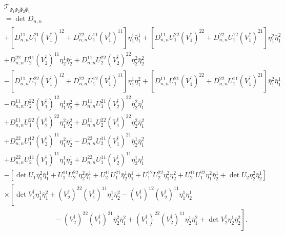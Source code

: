 \begin{align}
\label{eq:explicit}
	&\mathcal{T}_{\Psi_1\Psi_2\bar{\Psi}_2\bar{\Psi}_1}\nonumber\\
	&=\det D_{n,n} \nonumber \\
	&+\left[
	D^{11}_{n,n}U^{21}_{1}(V^{\dag}_{1})^{12}
	+D^{22}_{n,n}U^{11}_{1}(V^{\dag}_{1})^{11}
	\right]\eta^{1}_{1}\bar{\eta}^{1}_{1}
	+\left[
	D^{11}_{n,n}U^{22}_{1}(V^{\dag}_{1})^{22}
	+D^{22}_{n,n}U^{12}_{1}(V^{\dag}_{1})^{21}
	\right]\eta^{2}_{1}\bar{\eta}^{2}_{1}\nonumber\\
	&+D^{22}_{n,n}U^{11}_{2}(V^{\dag}_{2})^{11}\eta^{1}_{2}\bar{\eta}^{1}_{2}
	+D^{11}_{n,n}U^{22}_{2}(V^{\dag}_{2})^{22}\eta^{2}_{2}\bar{\eta}^{2}_{2}\nonumber\\
	&-\left[
	D^{11}_{n,n}U_{1}^{22}(V_{1}^{\dag})^{12}
	+D^{22}_{n,n}U_{1}^{12}(V_{1}^{\dag})^{11}
	\right]\eta^{1}_{1}\eta^{2}_{1}
	+\left[
	D^{11}_{n,n}U_{1}^{21}(V_{1}^{\dag})^{22}
	+D^{22}_{n,n}U_{1}^{11}(V_{1}^{\dag})^{21}
	\right]\bar{\eta}^{2}_{1}\bar{\eta}^{1}_{1}\nonumber\\
	&-D^{11}_{n,n}U_{2}^{22}(V_{1}^{\dag})^{12}\eta^{1}_{1}\eta^{2}_{2}
	+D^{11}_{n,n}U_{1}^{21}(V_{2}^{\dag})^{22}\bar{\eta}^{2}_{2}\bar{\eta}^{1}_{1}\nonumber\\
	&+D^{11}_{n,n}U_{1}^{22}(V_{2}^{\dag})^{22}\eta^{2}_{1}\bar{\eta}^{2}_{2}
	+D^{11}_{n,n}U_{2}^{22}(V_{1}^{\dag})^{22}\eta^{2}_{2}\bar{\eta}^{2}_{1}\nonumber\\
	&+D^{22}_{n,n}U_{1}^{12}(V_{2}^{\dag})^{11}\eta^{2}_{1}\eta^{1}_{2}
	-D^{22}_{n,n}U_{2}^{11}(V_{1}^{\dag})^{21}\bar{\eta}^{1}_{2}\bar{\eta}^{2}_{1}\nonumber\\
	&+D^{22}_{n,n}U_{2}^{11}(V_{1}^{\dag})^{11}\eta^{1}_{1}\bar{\eta}^{1}_{2}
	+D^{22}_{n,n}U_{1}^{11}(V_{2}^{\dag})^{11}\eta^{1}_{2}\bar{\eta}^{1}_{1}\nonumber\\
	&-\left[
	\det U_{1}\eta^{2}_{1}\bar{\eta}^{1}_{1}
	+U_{1}^{11}U_{2}^{22}\eta^{2}_{2}\bar{\eta}^{1}_{1}
	+U_{2}^{11}U_{1}^{21}\bar{\eta}^{1}_{2}\bar{\eta}^{1}_{1}%
	+U_{1}^{12}U_{2}^{22}\eta^{2}_{1}\eta^{2}_{2}
	+U_{2}^{11}U_{1}^{22}\eta^{2}_{1}\bar{\eta}^{1}_{2}
	+\det U_{2}\eta^{2}_{2}\bar{\eta}^{1}_{2}
	\right]\nonumber\\
	&\times\left[
	\det V_{1}^{\dag}\eta^{1}_{1}\bar{\eta}^{2}_{1}
	+(V_{2}^{\dag})^{22}(V_{1}^{\dag})^{11}\eta^{1}_{1}\bar{\eta}^{2}_{2}
	-(V_{1}^{\dag})^{12}(V_{2}^{\dag})^{11}\eta^{1}_{1}\eta^{1}_{2}\right.\nonumber\\
	&\left.\quad\quad\quad\quad\quad\quad\quad
	-(V_{2}^{\dag})^{22}(V_{1}^{\dag})^{21}\bar{\eta}^{2}_{2}\bar{\eta}^{2}_{1}
	+(V_{1}^{\dag})^{22}(V_{2}^{\dag})^{11}\eta^{1}_{2}\bar{\eta}^{2}_{1}
	+\det V_{2}^{\dag}\eta^{1}_{2}\bar{\eta}^{2}_{2}
	\right].
\end{align}


